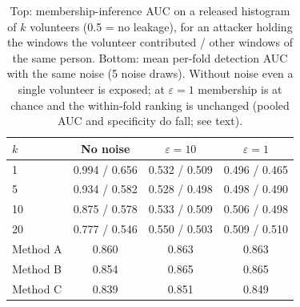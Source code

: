 \documentclass{article}
\begin{document}
\begin{table}[t]
\centering
\caption{Top: membership-inference AUC on a released histogram of $k$ volunteers (0.5 = no leakage), for an attacker holding the windows the volunteer contributed / other windows of the same person. Bottom: mean per-fold detection AUC with the same noise (5 noise draws). Without noise even a single volunteer is exposed; at $\varepsilon{=}1$ membership is at chance and the within-fold ranking is unchanged (pooled AUC and specificity do fall; see text).}
\label{tab:membership}
\setlength{\tabcolsep}{4pt}
\begin{tabular}{lccc}
\hline
\textbf{$k$} & \textbf{No noise} & \textbf{$\varepsilon{=}10$} & \textbf{$\varepsilon{=}1$} \\
\hline
1 & 0.994 / 0.656 & 0.532 / 0.509 & 0.496 / 0.465 \\
5 & 0.934 / 0.582 & 0.528 / 0.498 & 0.498 / 0.490 \\
10 & 0.875 / 0.578 & 0.533 / 0.509 & 0.506 / 0.498 \\
20 & 0.777 / 0.546 & 0.550 / 0.503 & 0.509 / 0.510 \\
\hline
Method A & 0.860 & 0.863 & 0.863 \\
Method B & 0.854 & 0.865 & 0.865 \\
Method C & 0.839 & 0.851 & 0.849 \\
\hline
\end{tabular}
\end{table}
\end{document}
